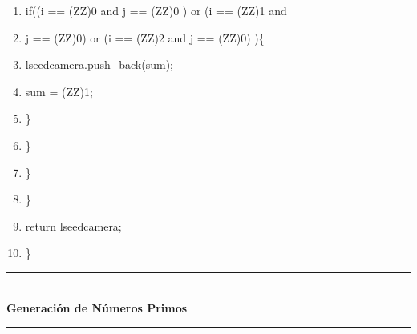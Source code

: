 \documentclass[11pt, conference]{IEEEtran}
\begin{document}
\begin{enumerate}
	\item \qquad\qquad\qquad\qquad if((i == (ZZ)0 and j == (ZZ)0 ) or (i == (ZZ)1 and
	\item \qquad\qquad\qquad\qquad j == (ZZ)0) or (i == (ZZ)2 and j == (ZZ)0) )\{
	\item \qquad\qquad\qquad\qquad\qquad lseedcamera.push\_back(sum);	
	\item \qquad\qquad\qquad\qquad\qquad sum = (ZZ)1;
	\item \qquad\qquad\qquad\qquad\}
	\item \qquad\qquad\qquad\}
	\item \qquad\qquad\}
	\item \qquad\}
	\item \qquad return lseedcamera;
	\item \}
\end{enumerate}
\rule[0mm]{181mm}{0.1mm}\\
\textbf{Generación de Números Primos}\\
\rule[3mm]{181mm}{0.1mm}
\end{document}
